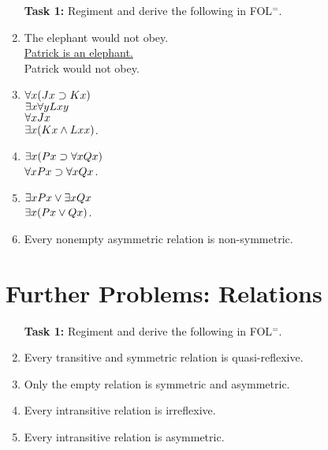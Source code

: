 \documentclass[a4paper, 11pt]{article} %
\begin{document}
\begin{enumerate}
  \item[\bf Task 1:] Regiment and derive the following in FOL$^=$.
  \item The elephant would not obey.\\
    \underline{Patrick is an elephant.}\\ 
    Patrick would not obey.
  \item $\forall x(Jx \supset Kx)$\\
    $\exists x\forall y Lxy$\\
    \underline{$\forall x Jx$}\\
    $\exists x(Kx \wedge Lxx)$.
  \item \underline{$\exists x(Px \supset \forall xQx)$}\\
    $\forall xPx \supset \forall xQx$.
  \item \underline{$\exists xPx \vee \exists xQx$}\\
    $\exists x(Px \vee Qx)$.
  \item Every nonempty asymmetric relation is non-symmetric.
\end{enumerate}






\section*{Further Problems: Relations}

\begin{enumerate}
  \item[\bf Task 1:] Regiment and derive the following in FOL$^=$.
  \item Every transitive and symmetric relation is quasi-reflexive.
  \item Only the empty relation is symmetric and asymmetric.
  \item Every intransitive relation is irreflexive.
  \item Every intransitive relation is asymmetric.
\end{enumerate}
\end{document}
